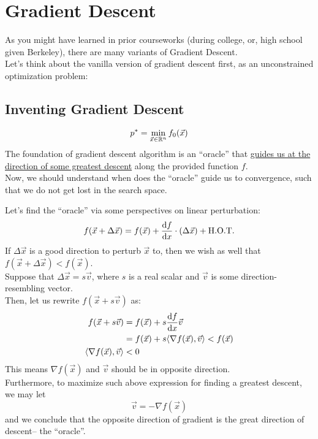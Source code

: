 \section{Gradient Descent}
As you might have learned in prior courseworks (during college, or, high school given Berkeley), there are many variants of Gradient Descent. \\
Let's think about the vanilla version of gradient descent first, as an unconstrained optimization problem:

\subsection{Inventing Gradient Descent}
\[
    p^* = \min_{\vec{x} \in \mathbb{R}^n} f_0(\vec{x})
\]
The foundation of gradient descent algorithm is an ``oracle'' that \underline{guides us at the direction of some greatest descent} along the provided function $f$. \\
Now, we should understand when does the ``oracle'' guide us to convergence, such that we do not get lost in the search space.
\par
Let's find the ``oracle'' via some perspectives on linear perturbation:
\begin{align*}
    f(\vec{x} + \Delta \vec{x}) = f(\vec{x}) + \dv{f}{x} \cdot (\Delta \vec{x}) + \text{H.O.T.}
\end{align*}
If $\Delta \vec{x}$ is a good direction to perturb $\vec{x}$ to, then we wish as well that $f(\vec{x} + \Delta \vec{x}) < f(\vec{x})$. \\
Suppose that $\Delta \vec{x} = s \vec{v}$, where $s$ is a real scalar and $\vec{v}$ is some direction-resembling vector. \\
Then, let us rewrite $f(\vec{x} + s \vec{v})$ as:
\begin{align*}
    f(\vec{x} + s \vec{v})
    &= f(\vec{x}) + s \dv{f}{x} {} \vec{v} \\
    &= f(\vec{x}) + s \langle \nabla f(\vec{x}), \vec{v} \rangle < f(\vec{x}) \\
    \langle \nabla f(\vec{x}), \vec{v} \rangle &< 0
\end{align*}
This means $\nabla f(\vec{x})$ and $\vec{v}$ should be in opposite direction. \\
Furthermore, to maximize such above expression for finding a greatest descent, we may let
\[
    \vec{v} = - \nabla f(\vec{x})
\]
and we conclude that the opposite direction of gradient is the great direction of descent-- the ``oracle''.
\par
